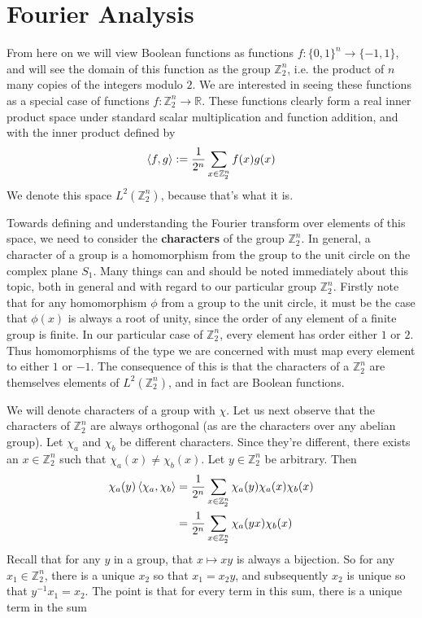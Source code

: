 \section{Fourier Analysis}
	From here on we will view Boolean functions as functions $f:\{0,1\}^n \to \{-1,1\}$, and will see the domain of this function as the group $\mathbb{Z}_2^n$, i.e. the product of $n$ many copies of the integers modulo $2$. We are interested in seeing these functions as a special case of functions $f:\mathbb{Z}_2^n \to \mathbb{R}$. These functions clearly form a real inner product space under standard scalar multiplication and function addition, and with the inner product defined by
	\[ \braket{f,g} := \frac{1}{2^n}\sum_{x \in \mathbb{Z}_2^n} f(x)g(x) \]
We denote this space $L^2(\mathbb{Z}_2^n)$, because that's what it is. \par 
Towards defining and understanding the Fourier transform over elements of this space, we need to consider the \textbf{characters} of the group $\mathbb{Z}_2^n$. In general, a character of a group is a homomorphism from the group to the unit circle on the complex plane $S_1$. Many things can and should be noted immediately about this topic, both in general and with regard to our particular group $\mathbb{Z}_2^n$. Firstly note that for any homomorphism $\phi$ from a group to the unit circle, it must be the case that $\phi(x)$ is always a root of unity, since the order of any element of a finite group is finite. In our particular case of $\mathbb{Z}_2^n$, every element has order either $1$ or $2$. Thus homomorphisms of the type we are concerned with must map every element to either $1$ or $-1$. The consequence of this is that the characters of a $\mathbb{Z}_2^n$ are themselves elements of $L^2(\mathbb{Z}_2^n)$, and in fact are Boolean functions. \par 
We will denote characters of a group with $\chi$. Let us next observe that the characters of $\mathbb{Z}_2^n$ are always orthogonal (as are the characters over any abelian group). Let $\chi_a$ and $\chi_b$ be different characters. Since they're different, there exists an $x \in \mathbb{Z}_2^n$ such that $\chi_a(x) \neq \chi_b(x)$. Let $y \in \mathbb{Z}_2^n$ be arbitrary. Then 
\begin{align}
	 \chi_a(y)\braket{\chi_a,\chi_b} &= \frac{1}{2^n}\sum_{x \in \mathbb{Z}_2^n} \chi_a(y)\chi_a(x)\chi_b(x) \\
	 &= \frac{1}{2^n}\sum_{x \in \mathbb{Z}_2^n} \chi_a(yx)\chi_b(x)
\end{align}
Recall that for any $y$ in a group, that $x \mapsto xy$ is always a bijection. So for any $x_1 \in \mathbb{Z}_2^n$, there is a unique $x_2$ so that $x_1 = x_2y$, and subsequently $x_2$ is unique so that $y^{-1}x_1 = x_2$. The point is that for every term in this sum, there is a unique term in the sum
